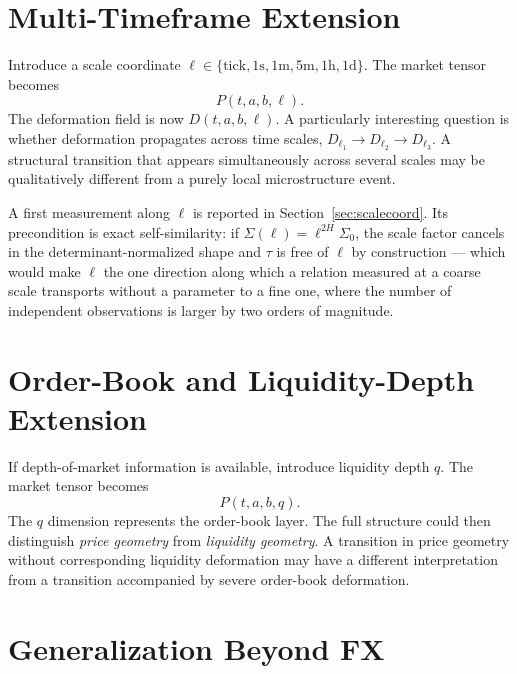 \documentclass[11pt,a4paper]{article}
\numberwithin{equation}{section}
\begin{document}
\section{Multi-Timeframe Extension}

Introduce a scale coordinate
$\ell\in\{\text{tick},1\mathrm{s},1\mathrm{m},5\mathrm{m},
1\mathrm{h},1\mathrm{d}\}$. The market tensor becomes
\begin{equation}
P(t,a,b,\ell).
\end{equation}
The deformation field is now $D(t,a,b,\ell)$. A particularly
interesting question is whether deformation propagates across time
scales, $D_{\ell_1}\rightarrow D_{\ell_2}\rightarrow D_{\ell_3}$. A
structural transition that appears simultaneously across several
scales may be qualitatively different from a purely local
microstructure event.

A first measurement along $\ell$ is reported in
Section~\ref{sec:scalecoord}. Its precondition is exact
self-similarity: if $\Sigma(\ell)=\ell^{2H}\Sigma_0$, the
scale factor cancels in the determinant-normalized shape and $\tau$
is free of $\ell$ by construction --- which would make $\ell$ the
one direction along which a relation measured at a coarse scale
transports without a parameter to a fine one, where the number of
independent observations is larger by two orders of magnitude.

\section{Order-Book and Liquidity-Depth Extension}

If depth-of-market information is available, introduce liquidity
depth $q$. The market tensor becomes
\begin{equation}
P(t,a,b,q).
\end{equation}
The $q$ dimension represents the order-book layer. The full
structure could then distinguish \emph{price geometry} from
\emph{liquidity geometry}. A transition in price geometry without
corresponding liquidity deformation may have a different
interpretation from a transition accompanied by severe order-book
deformation.

\section{Generalization Beyond FX}\label{sec:generalization}
\end{document}
